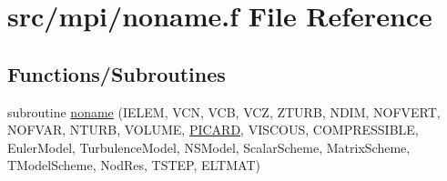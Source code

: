 \hypertarget{mpi_2noname_8f}{\section{src/mpi/noname.f File Reference}
\label{mpi_2noname_8f}
}
\subsection*{Functions/\-Subroutines}
\begin{DoxyCompactItemize}
\item 
subroutine \hyperlink{mpi_2noname_8f_a3579d52ea1a8b01374dd1bbc210ceacc}{noname} (I\-E\-L\-E\-M, V\-C\-N, V\-C\-B, V\-C\-Z, Z\-T\-U\-R\-B, N\-D\-I\-M, N\-O\-F\-V\-E\-R\-T, N\-O\-F\-V\-A\-R, N\-T\-U\-R\-B, V\-O\-L\-U\-M\-E, \hyperlink{implicit_8h_a699fe3c650f16fbb4a56d74dee7a8109}{P\-I\-C\-A\-R\-D}, V\-I\-S\-C\-O\-U\-S, C\-O\-M\-P\-R\-E\-S\-S\-I\-B\-L\-E, Euler\-Model, Turbulence\-Model, N\-S\-Model, Scalar\-Scheme, Matrix\-Scheme, T\-Model\-Scheme, Nod\-Res, T\-S\-T\-E\-P, E\-L\-T\-M\-A\-T)
\end{DoxyCompactItemize}


